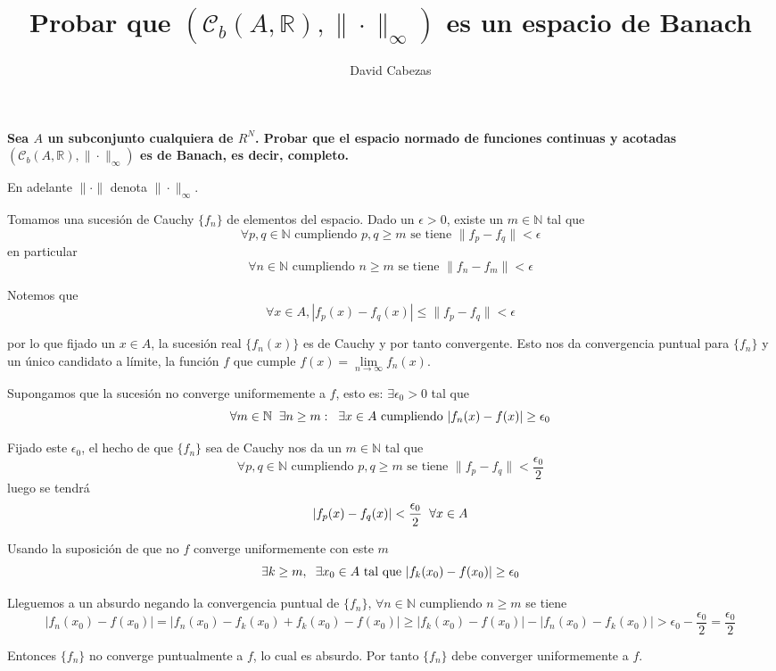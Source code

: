 \documentclass{article}
\begin{document}
\title{Probar que $(\mathcal{C}_b(A,\mathbb{R}), \|\cdot\|_\infty)$ es
  un espacio de Banach}
\author{David Cabezas} \date{}
\maketitle
\begin{flushleft}
  \textbf {Sea $A$ un subconjunto cualquiera de $R^N$. Probar que el
    espacio normado de funciones continuas y acotadas
    $(\mathcal{C}_b(A,\mathbb{R}), \|\cdot\|_\infty)$ es de Banach, es
    decir, completo.}

  En adelante $\|\cdot\|$ denota $\|\cdot\|_\infty$.

  Tomamos una sucesión de Cauchy $\{f_n\}$ de elementos del espacio.
  Dado un $\epsilon>0$, existe un $m \in \mathbb{N}$ tal que
  $$\forall p,q \in \mathbb{N} \text{ cumpliendo }  p,q \geq m \text{ se tiene } \|f_p - f_q\| < \epsilon$$
  en particular
  $$\forall n \in \mathbb{N} \text{ cumpliendo } n \geq m \text{ se
    tiene } \|f_n - f_m\| < \epsilon$$

  Notemos que
  $$\forall x \in A, |f_p(x)-f_q(x)| \leq \|f_p-f_q\| < \epsilon$$

  por lo que fijado un $x \in A$, la sucesión real $\{f_n(x)\}$ es de
  Cauchy y por tanto convergente. Esto nos da convergencia puntual
  para $\{f_n\}$ y un único candidato a límite, la función $f$ que
  cumple $f(x) = \lim\limits_{n \to \infty}f_n(x)$.

  Supongamos que la sucesión no converge uniformemente a $f$, esto es:
  $\exists \epsilon_0 > 0$ tal que
  $$\forall m \in \mathbb{N} \hspace{2mm} \exists n \geq m: \hspace{2mm} \exists x \in A
  \text{ cumpliendo } |f_n(x) - f(x)| \geq \epsilon_0$$

  Fijado este $\epsilon_0$, el hecho de que $\{f_n\}$ sea de Cauchy
  nos da un $m \in \mathbb{N}$ tal que
  $$\forall p, q \in \mathbb{N} \text{ cumpliendo }  p,q \geq m
  \text{ se tiene } \|f_p - f_q\| < \frac{\epsilon_0}{2}$$ luego se
  tendrá
  $$|f_p(x) - f_q(x)| < \frac{\epsilon_0}{2} \hspace{2mm} \forall x
  \in A$$

  Usando la suposición de que no $f$ converge uniformemente con este
  $m$
  $$\exists k \geq m, \hspace{2mm} \exists x_0 \in A \text{ tal que } |f_k(x_0) - f(x_0)| \geq \epsilon_0$$

  Lleguemos a un absurdo negando la convergencia puntual de $\{f_n\}$,
  $\forall n \in \mathbb{N}$ cumpliendo $n \geq m$ se tiene
  $$|f_n(x_0) - f(x_0)| = |f_n(x_0) - f_k(x_0) + f_k(x_0) - f(x_0)| \geq
  |f_k(x_0) - f(x_0)| - |f_n(x_0) - f_k(x_0)| > \epsilon_0 -
\frac{\epsilon_0}{2} = \frac{\epsilon_0}{2}$$

Entonces $\{f_n\}$ no converge puntualmente a $f$, lo cual es absurdo.
Por tanto $\{f_n\}$ debe converger uniformemente a $f$. 
\end{flushleft}
\end{document}
